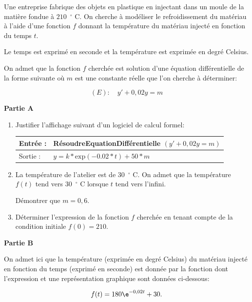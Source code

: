 \medskip

Une entreprise fabrique des objets en plastique en injectant dans un moule de la matière fondue à $210$~\ensuremath{^\circ} C. On cherche à modéliser le refroidissement du matériau à l'aide d'une fonction $f$ donnant la température du matériau injecté en fonction du temps $t$.

Le temps est exprimé en seconde et la température est exprimée en degré Celsius.

On admet que la fonction $f$ cherchée est solution d'une équation différentielle de la forme suivante où $m$ est une constante réelle que l'on cherche à déterminer:

\[(E) : \quad  y'  +0,02y = m\]


\textbf{Partie A}

\medskip

\begin{enumerate}
\item Justifier l'affichage suivant d'un logiciel de calcul formel:

\begin{center}
\begin{tabularx}{\linewidth}{|l|X|}\hline
Entrée :& RésoudreEquationDifférentielle $(y' + 0,02y = m)$\\ \hline
Sortie :& \fbox{$\to$}\: $y = k *\text{exp}(-0.02 * t) + 50 * m$\\ \hline
\end{tabularx}
\end{center}

\item  La température de l'atelier est de 30~\ensuremath{^\circ} C. On admet que la température $f(t)$ tend vers 30~\ensuremath{^\circ} C lorsque $t$ tend vers l'infini.

Démontrer que $m = 0,6$.
\item Déterminer l'expression de la fonction $f$ cherchée en tenant compte de la condition
initiale $f(0) = 210.$
\end{enumerate}

\medskip

\textbf{Partie B}

\medskip

On admet ici que la température (exprimée en degré Celsius) du matériau injecté en fonction du temps (exprimé en seconde) est donnée par la fonction dont l'expression et une représentation graphique sont données ci-dessous:

\[f(t) =180 \e^{-0,02t} + 30.\]

